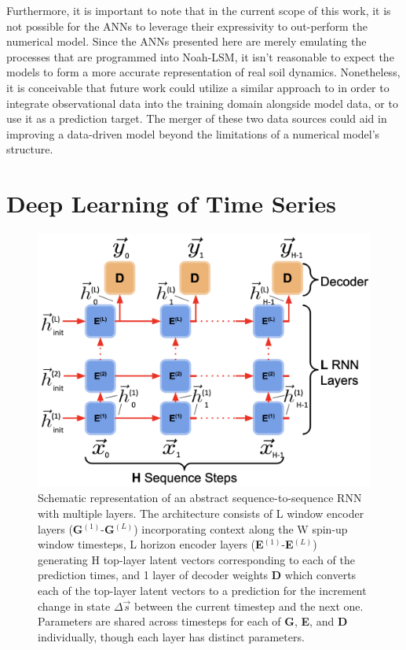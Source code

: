 Furthermore, it is important to note that in the current scope of this work, it is not possible for the ANNs to leverage their expressivity to out-perform the numerical model. Since the ANNs presented here are merely emulating the processes that are programmed into Noah-LSM, it isn't reasonable to expect the models to form a more accurate representation of real soil dynamics. Nonetheless, it is conceivable that future work could utilize a similar approach to \citep{o_global_2021} in order to integrate observational data into the training domain alongside model data, or to use it as a prediction target. The merger of these two data sources could aid in improving a data-driven model beyond the limitations of a numerical model's structure.

\section{Deep Learning of Time Series}

\begin{figure}[ht]
    \centering

    \includegraphics[width=.95\linewidth]{Figures/schematic_abstract-rnn.png}

    \caption{Schematic representation of an abstract sequence-to-sequence RNN with multiple layers. The architecture consists of L window encoder layers (\textbf{G}$^{(1)}$-\textbf{G}$^{(L)}$) incorporating context along the W spin-up window timesteps, L horizon encoder layers (\textbf{E}$^{(1)}$-\textbf{E}$^{(L)}$) generating H top-layer latent vectors corresponding to each of the prediction times, and 1 layer of decoder weights \textbf{D} which converts each of the top-layer latent vectors to a prediction for the increment change in state $\Delta \vec{s}$ between the current timestep and the next one. Parameters are shared across timesteps for each of \textbf{G}, \textbf{E}, and \textbf{D} individually, though each layer has distinct parameters.}
    \label{s2s-default}
\end{figure}

